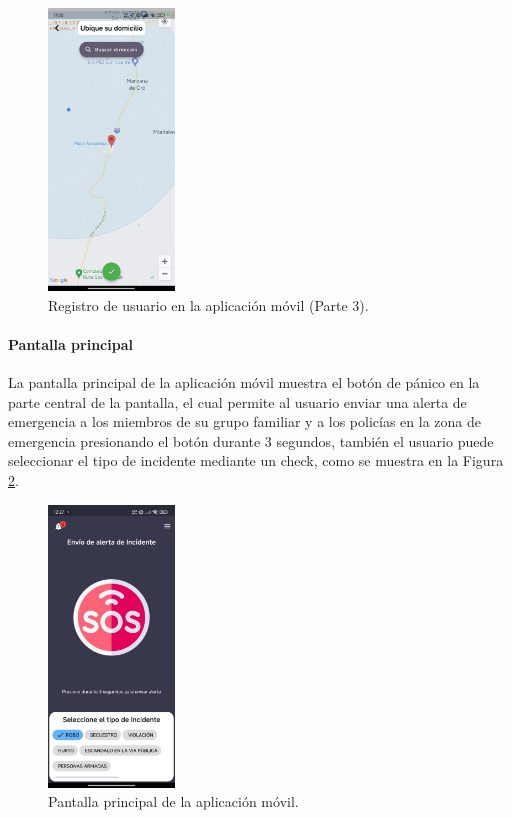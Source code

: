 \begin{figure}[H]
    \centering
    \includegraphics[width=0.3\textwidth]{chapters/III-resultados-y-discusion/resources/images/registro-usuario-movil-3.png}
    \caption{Registro de usuario en la aplicación móvil (Parte 3).}
    \label{fig:registro-usuario-movil-3}
\end{figure}

\paragraph{Pantalla principal}
La pantalla principal de la aplicación móvil muestra el botón de pánico en la parte central de la pantalla, el cual permite al usuario
enviar una alerta de emergencia a los miembros de su grupo familiar y a los policías en la zona de emergencia presionando el botón
durante 3 segundos, también el usuario puede seleccionar el tipo de incidente mediante un check, como se muestra en la Figura
\ref{fig:pantalla-principal-movil}.

\begin{figure}[H]
    \centering
    \includegraphics[width=0.3\textwidth]{chapters/III-resultados-y-discusion/resources/images/pantalla-principal-movil.png}
    \caption{Pantalla principal de la aplicación móvil.}
    \label{fig:pantalla-principal-movil}
\end{figure}

